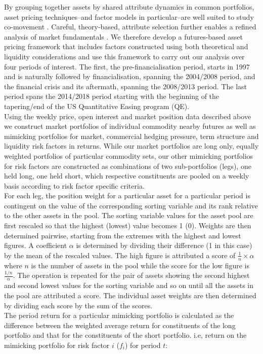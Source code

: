 \documentclass[
  authoryear,
  preprint,
  3p]{elsarticle}
\begin{document}
By grouping together assets by shared attribute dynamics in common
portfolios, asset pricing techniques--and factor models in
particular--are well suited to study co-movement
\citep{fama_common_1993, carhart_persistence_1997, asness_devil_2013, fama_five_factor_2015, hou_digesting_2015, asness_fact_2015, frazzini_betting_2014, asness_quality_2019}.
Careful, theory-based, attribute selection further enables a refined
analysis of market fundamentals
\citep{schwartz_short_2000, miffre_momentum_2007, gorton_fundamentals_2012, cortazar_commodity_2013, yang_investment_2013, daskalaki_factors_2014, szymanowska_anatomy_2014, fernandez_skewness_2018, bakshi_understanding_2019, boons_basis_2019, sakkas_factor_2020}.
We therefore develop a futures-based asset pricing framework that
includes factors constructed using both theoretical and liquidity
considerations and use this framework to carry out our analysis over
four periods of interest. The first, the pre-financialisation period,
starts in 1997 and is naturally followed by financialisation, spanning
the 2004/2008 period, and the financial crisis and its aftermath,
spanning the 2008/2013 period. The last period spans the 2014/2018
period starting with the beginning of the tapering/end of the US
Quantitative Easing program (QE).\\
Using the weekly price, open interest and market position data described
above we construct market portfolios of individual commodity nearby
futures as well as mimicking portfolios for market, commercial hedging
pressure, term structure and liquidity risk factors in returns. While
our market portfolios are long only, equally weighted portfolios of
particular commodity sets, our other mimicking portfolios for risk
factors are constructed as combinations of two sub-portfolios (legs),
one held long, one held short, which respective constituents are pooled
on a weekly basis according to risk factor specific criteria.\\
For each leg, the position weight for a particular asset for a
particular period is contingent on the value of the corresponding
sorting variable and its rank relative to the other assets in the pool.
The sorting variable values for the asset pool are first rescaled so
that the highest (lowest) value becomes 1 (0). Weights are then
determined pairwise, starting from the extremes with the highest and
lowest figures. A coefficient \(\alpha\) is determined by dividing their
difference (1 in this case) by the mean of the rescaled values. The high
figure is attributed a score of \(\frac{1}{n} \times \alpha\) where
\(n\) is the number of assets in the pool while the score for the low
figure is \(\frac{1/n}{\alpha}\). The operation is repeated for the pair
of assets showing the second highest and second lowest values for the
sorting variable and so on until all the assets in the pool are
attributed a score. The individual asset weights are then determined by
dividing each score by the sum of the scores.\\
The period return for a particular mimicking portfolio is calculated as
the difference between the weighted average return for constituents of
the long portfolio and that for the constituents of the short portfolio.
i.e, return on the mimicking portfolio for risk factor \(i\) (\(f_{i}\))
for period \(t\):
\end{document}
